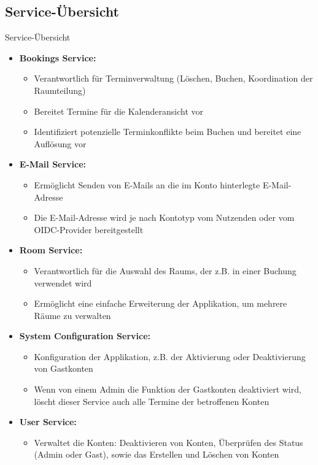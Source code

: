 \documentclass{sdqbeamer}
\begin{document}
\subsection{Service-Übersicht}
\begin{frame}{Service-Übersicht}
    \begin{itemize}
        \item \textbf{Bookings Service:}
        \begin{itemize}
            \item Verantwortlich für Terminverwaltung (Löschen, Buchen, Koordination der Raumteilung)
            \item Bereitet Termine für die Kalenderansicht vor
            \item Identifiziert potenzielle Terminkonflikte beim Buchen und bereitet eine Auflösung vor
        \end{itemize}
        \item \textbf{E-Mail Service:}
        \begin{itemize}
            \item Ermöglicht Senden von E-Mails an die im Konto hinterlegte E-Mail-Adresse
            \item Die E-Mail-Adresse wird je nach Kontotyp vom Nutzenden oder vom OIDC-Provider bereitgestellt
        \end{itemize}
        \item \textbf{Room Service:}
        \begin{itemize}
            \item Verantwortlich für die Auswahl des Raums, der z.B. in einer Buchung verwendet wird
            \item Ermöglicht eine einfache Erweiterung der Applikation, um mehrere Räume zu verwalten
        \end{itemize}
        \item \textbf{System Configuration Service:}
        \begin{itemize}
            \item Konfiguration der Applikation, z.B. der Aktivierung oder Deaktivierung von Gastkonten
            \item Wenn von einem Admin die Funktion der Gastkonten deaktiviert wird, löscht dieser Service auch alle Termine der betroffenen Konten
        \end{itemize}
        \item \textbf{User Service:}
        \begin{itemize}
            \item Verwaltet die Konten: Deaktivieren von Konten, Überprüfen des Status (Admin oder Gast), sowie das Erstellen und Löschen von Konten
        \end{itemize}
    \end{itemize}
\end{frame}
\end{document}
